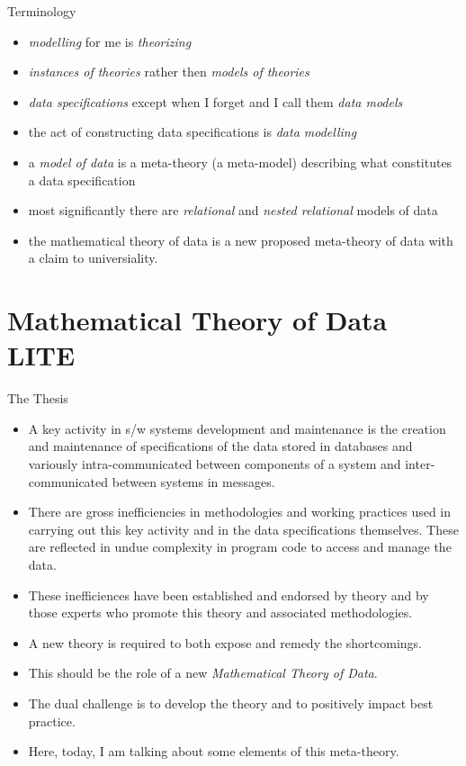 \begin{frame}{Terminology}
\begin{itemize}
\item \textit{modelling} for me is \textit{theorizing}
\item \textit{instances of theories}  rather then \textit{models of theories}
\item \textit{data specifications} except when I forget and I call them \textit{data models}
\item the act of constructing data specifications is \textit{data modelling}
\item a \textit{model of data} is a meta-theory (a meta-model) describing what constitutes a data specification 
\item most significantly there are \textit{relational} and \textit{nested relational} models of data
\item the mathematical theory of data is a new proposed meta-theory of data with a claim to universiality.
\end{itemize}
\end{frame}


\section{Mathematical Theory of Data LITE}

\begin{frame}{The Thesis}
\begin{itemize}[<+->]
  \item A key activity in s/w systems development and maintenance is the creation and maintenance of specifications of the data stored in databases and variously intra-communicated between components of a system and inter-communicated between systems in messages. 
  \item There are gross inefficiencies in methodologies and working practices used in carrying out this key activity and in the data specifications themselves. These are reflected in undue complexity in program code to access and manage the data.
  \item These inefficiences have been established and endorsed by theory and by those experts who promote this theory and associated methodologies.
  \item A new theory is required to both expose and remedy the shortcomings.
  \item This should be the role of a new \textit{Mathematical Theory of Data}.
  \item The dual challenge is to develop the theory and to positively impact best practice.
  \item Here, today, I am talking about some elements of this meta-theory.
\end{itemize}
\end{frame}

